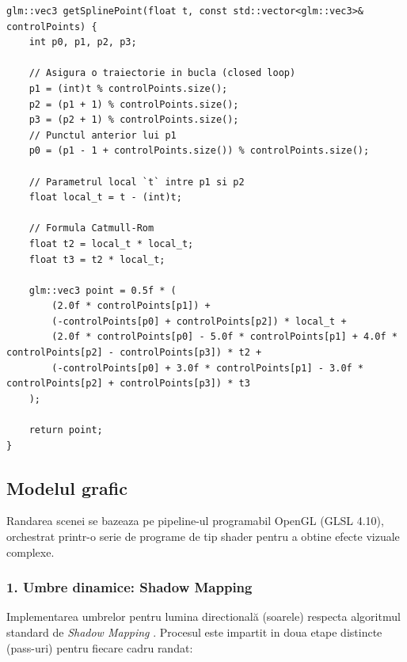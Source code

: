 \documentclass[11pt,a4paper]{article}
\begin{document}
\begin{verbatim}
glm::vec3 getSplinePoint(float t, const std::vector<glm::vec3>& controlPoints) {
    int p0, p1, p2, p3;
    
    // Asigura o traiectorie in bucla (closed loop)
    p1 = (int)t % controlPoints.size();
    p2 = (p1 + 1) % controlPoints.size();
    p3 = (p2 + 1) % controlPoints.size();
    // Punctul anterior lui p1
    p0 = (p1 - 1 + controlPoints.size()) % controlPoints.size();

    // Parametrul local `t` intre p1 si p2
    float local_t = t - (int)t;

    // Formula Catmull-Rom
    float t2 = local_t * local_t;
    float t3 = t2 * local_t;

    glm::vec3 point = 0.5f * (
        (2.0f * controlPoints[p1]) +
        (-controlPoints[p0] + controlPoints[p2]) * local_t +
        (2.0f * controlPoints[p0] - 5.0f * controlPoints[p1] + 4.0f * controlPoints[p2] - controlPoints[p3]) * t2 +
        (-controlPoints[p0] + 3.0f * controlPoints[p1] - 3.0f * controlPoints[p2] + controlPoints[p3]) * t3
    );

    return point;
}
\end{verbatim}

\subsection{Modelul grafic}
Randarea scenei se bazeaza pe pipeline-ul programabil OpenGL (GLSL 4.10), orchestrat printr-o serie de programe de tip shader pentru a obtine efecte vizuale complexe.

\subsubsection{1. Umbre dinamice: Shadow Mapping}
Implementarea umbrelor pentru lumina directională (soarele) respecta algoritmul standard de \textit{Shadow Mapping} \cite{lab9}. Procesul este impartit in doua etape distincte (pass-uri) pentru fiecare cadru randat:
\end{document}
